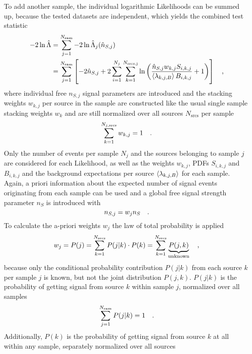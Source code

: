 To add another sample, the individual logarithmic Likelihoods can be summed up, because the tested datasets are independent, which yields the combined test statistic
\begin{align}
  -2\ln\hat{\Lambda}
  &= \sum_{j=1}^{N_\text{sam}} -2\ln\hat{\Lambda}_j(\hat{n}_{S,j}) \\
  &= \sum_{j=1}^{N_\text{sam}} \left[
        -2\hat{n}_{S,j} +
        2\sum_{i=1}^{N_j} \sum_{k=1}^{N_\text{srcs,j}} \ln\left(
          \frac{\hat{n}_{S,j} w_{k,j} S_{i,k,j}}
               {\Braket{\lambda_{k,j,B}} B_{i,k,j}}
          + 1
        \right)
      \right]
  \quad\text{,}
\end{align}
where individual free $n_{S,j}$ signal parameters are introduced and the stacking weights $w_{k,j}$ per source in the sample are constructed like the usual single sample stacking weights $w_k$ and are still normalized over all sources $N_\text{srcs}$ per sample
\begin{equation}
  \sum_{k=1}^{N_{j,\text{srcs}}} w_{k,j} = 1
  \quad\text{.}
\end{equation}
Only the number of events per sample $N_j$ and the sources belonging to sample $j$ are considered for each Likelihood, as well as the weights $w_{k,j}$, PDFs $S_{i,k,j}$ and $B_{i,k,j}$ and the background expectations per source $\Braket{\lambda_{k,j,B}}$ for each sample.
Again, a priori information about the expected number of signal events originating from each sample can be used and a global free signal strength parameter $n_S$ is introduced with
\begin{equation}
  n_{S,j} = w_j n_S
  \quad\text{.}
\end{equation}
To calculate the a-priori weights $w_j$ the law of total probability is applied
\begin{equation}
  w_j = P(j) = \sum_{k=1}^{N_\text{srcs}} P(j|k)\cdot P(k)
  = \sum_{k=1}^{N_\text{srcs}} \underbrace{P(j,k)}_\text{unknown}
  \quad\text{,}
\end{equation}
because only the conditional probability contribution $P(j|k)$ from each source $k$ per sample $j$ is known, but not the joint distribution $P(j,k)$.
$P(j|k)$ is the probability of getting signal from source $k$ within sample $j$, normalized over all samples
\begin{equation}
  \sum_{j=1}^{N_\text{sam}} P(j|k) = 1
  \quad\text{.}
\end{equation}
Additionally, $P(k)$ is the probability of getting signal from source $k$ at all within any sample, separately normalized over all sources
